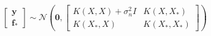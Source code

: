\documentclass[10pt]{article}
\begin{document}
\begin{align*}\begin{bmatrix}
  \mathbf{y} \\
  \mathbf{f}_*
\end{bmatrix}
\sim 
\mathcal{N} \left( \mathbf{0},
\begin{bmatrix}
  K(X, X) + \sigma_n^2I & K(X, X_*) \\
  K(X_*, X) & K(X_*, X_*)
\end{bmatrix}
\right)\end{align*}
\end{document}
